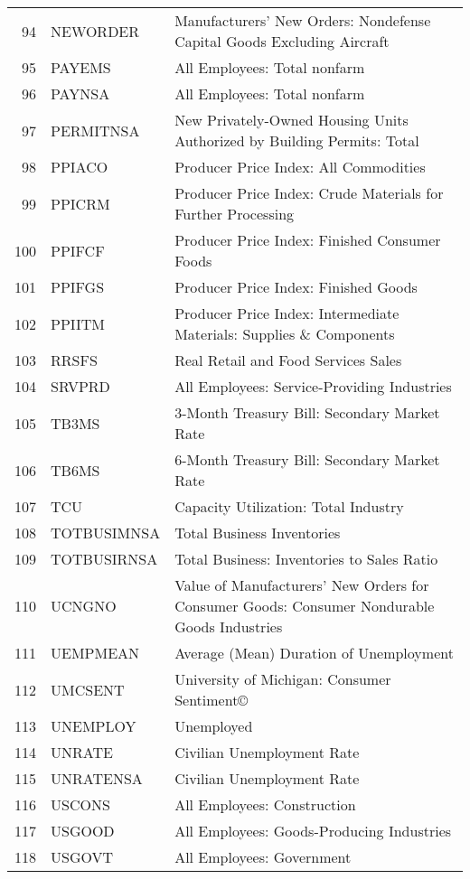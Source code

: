 \begin{table}[ht]
\begin{tabular}{rll}
  94 & NEWORDER & Manufacturers' New Orders: Nondefense Capital Goods Excluding Aircraft \\ 
  95 & PAYEMS & All Employees: Total nonfarm \\ 
  96 & PAYNSA & All Employees: Total nonfarm \\ 
  97 & PERMITNSA & New Privately-Owned Housing Units Authorized by Building Permits: Total \\ 
  98 & PPIACO & Producer Price Index: All Commodities \\ 
  99 & PPICRM & Producer Price Index: Crude Materials for Further Processing \\ 
  100 & PPIFCF & Producer Price Index: Finished Consumer Foods \\ 
  101 & PPIFGS & Producer Price Index: Finished Goods \\ 
  102 & PPIITM & Producer Price Index: Intermediate Materials: Supplies \& Components \\ 
  103 & RRSFS & Real Retail and Food Services Sales \\ 
  104 & SRVPRD & All Employees: Service-Providing Industries \\ 
  105 & TB3MS & 3-Month Treasury Bill: Secondary Market Rate \\ 
  106 & TB6MS & 6-Month Treasury Bill: Secondary Market Rate \\ 
  107 & TCU & Capacity Utilization: Total Industry \\ 
  108 & TOTBUSIMNSA & Total Business Inventories \\ 
  109 & TOTBUSIRNSA & Total Business: Inventories to Sales Ratio \\ 
  110 & UCNGNO & Value of Manufacturers' New Orders for Consumer Goods: Consumer Nondurable Goods Industries \\ 
  111 & UEMPMEAN & Average (Mean) Duration of Unemployment \\ 
  112 & UMCSENT & University of Michigan: Consumer Sentiment© \\ 
  113 & UNEMPLOY & Unemployed \\ 
  114 & UNRATE & Civilian Unemployment Rate \\ 
  115 & UNRATENSA & Civilian Unemployment Rate \\ 
  116 & USCONS & All Employees: Construction \\ 
  117 & USGOOD & All Employees: Goods-Producing Industries \\ 
  118 & USGOVT & All Employees: Government \\ 

\end{tabular}
\end{table}
